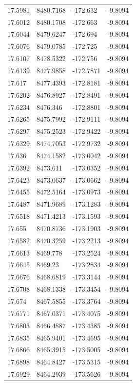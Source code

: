 \begin{table}[H]
\begin{tabular}{llll}
17.5981 & 8480.7168 & -172.632 & -9.8094 \\
17.6012 & 8480.1708 & -172.663 & -9.8094 \\
17.6044 & 8479.6247 & -172.694 & -9.8094 \\
17.6076 & 8479.0785 & -172.725 & -9.8094 \\
17.6107 & 8478.5322 & -172.756 & -9.8094 \\
17.6139 & 8477.9858 & -172.7871 & -9.8094 \\
17.617 & 8477.4393 & -172.8181 & -9.8094 \\
17.6202 & 8476.8927 & -172.8491 & -9.8094 \\
17.6234 & 8476.346 & -172.8801 & -9.8094 \\
17.6265 & 8475.7992 & -172.9111 & -9.8094 \\
17.6297 & 8475.2523 & -172.9422 & -9.8094 \\
17.6329 & 8474.7053 & -172.9732 & -9.8094 \\
17.636 & 8474.1582 & -173.0042 & -9.8094 \\
17.6392 & 8473.611 & -173.0352 & -9.8094 \\
17.6423 & 8473.0637 & -173.0662 & -9.8094 \\
17.6455 & 8472.5164 & -173.0973 & -9.8094 \\
17.6487 & 8471.9689 & -173.1283 & -9.8094 \\
17.6518 & 8471.4213 & -173.1593 & -9.8094 \\
17.655 & 8470.8736 & -173.1903 & -9.8094 \\
17.6582 & 8470.3259 & -173.2213 & -9.8094 \\
17.6613 & 8469.778 & -173.2524 & -9.8094 \\
17.6645 & 8469.23 & -173.2834 & -9.8094 \\
17.6676 & 8468.6819 & -173.3144 & -9.8094 \\
17.6708 & 8468.1338 & -173.3454 & -9.8094 \\
17.674 & 8467.5855 & -173.3764 & -9.8094 \\
17.6771 & 8467.0371 & -173.4075 & -9.8094 \\
17.6803 & 8466.4887 & -173.4385 & -9.8094 \\
17.6835 & 8465.9401 & -173.4695 & -9.8094 \\
17.6866 & 8465.3915 & -173.5005 & -9.8094 \\
17.6898 & 8464.8427 & -173.5315 & -9.8094 \\
17.6929 & 8464.2939 & -173.5626 & -9.8094 \\

\end{tabular}
\end{table}
